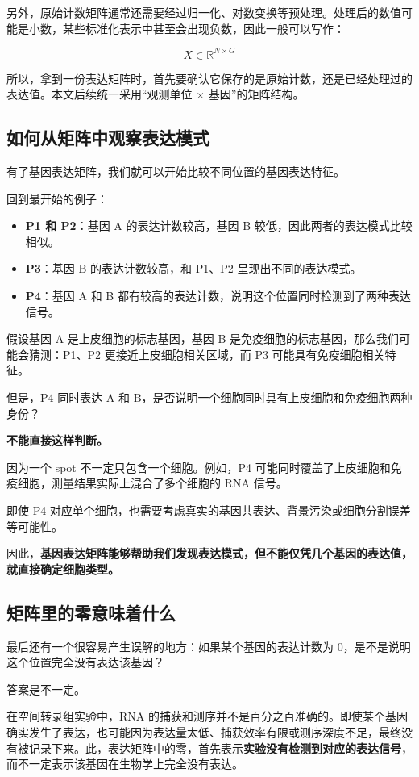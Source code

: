 \documentclass[UTF8,a4paper,11pt,fontset=fandol]{ctexart}
\begin{document}
另外，原始计数矩阵通常还需要经过归一化、对数变换等预处理。处理后的数值可能是小数，某些标准化表示中甚至会出现负数，因此一般可以写作：

\[
  X\in\mathbb{R}^{N\times G}
\]

所以，拿到一份表达矩阵时，首先要确认它保存的是原始计数，还是已经处理过的表达值。本文后续统一采用“观测单位 $\times$ 基因”的矩阵结构。


\subsection{如何从矩阵中观察表达模式}

有了基因表达矩阵，我们就可以开始比较不同位置的基因表达特征。

回到最开始的例子：

\begin{itemize}
  \item \textbf{P1 和 P2}：基因 A 的表达计数较高，基因 B 较低，因此两者的表达模式比较相似。
  \item \textbf{P3}：基因 B 的表达计数较高，和 P1、P2 呈现出不同的表达模式。
  \item \textbf{P4}：基因 A 和 B 都有较高的表达计数，说明这个位置同时检测到了两种表达信号。
\end{itemize}

假设基因 A 是上皮细胞的标志基因，基因 B 是免疫细胞的标志基因，那么我们可能会猜测：P1、P2 更接近上皮细胞相关区域，而 P3 可能具有免疫细胞相关特征。

但是，P4 同时表达 A 和 B，是否说明一个细胞同时具有上皮细胞和免疫细胞两种身份？

\textbf{不能直接这样判断。}

因为一个 spot 不一定只包含一个细胞。例如，P4 可能同时覆盖了上皮细胞和免疫细胞，测量结果实际上混合了多个细胞的 RNA 信号。

即使 P4 对应单个细胞，也需要考虑真实的基因共表达、背景污染或细胞分割误差等可能性。

因此，\textbf{基因表达矩阵能够帮助我们发现表达模式，但不能仅凭几个基因的表达值，就直接确定细胞类型。}

\subsection{矩阵里的零意味着什么}

最后还有一个很容易产生误解的地方：如果某个基因的表达计数为 0，是不是说明这个位置完全没有表达该基因？

答案是不一定。

在空间转录组实验中，RNA 的捕获和测序并不是百分之百准确的。即使某个基因确实发生了表达，也可能因为表达量太低、捕获效率有限或测序深度不足，最终没有被记录下来。此，表达矩阵中的零，首先表示\textbf{实验没有检测到对应的表达信号}，而不一定表示该基因在生物学上完全没有表达。
\end{document}
